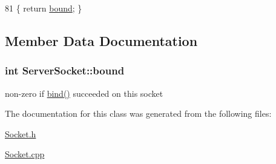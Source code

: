 \begin{DoxyCode}
81 \{ \textcolor{keywordflow}{return} \hyperlink{classServerSocket_ae7e043fe5c2a7abdcc3d83219fe5106f}{bound}; \}
\end{DoxyCode}


\subsection{Member Data Documentation}
\hypertarget{classServerSocket_ae7e043fe5c2a7abdcc3d83219fe5106f}{}
\subsubsection[{bound}]{\setlength{\rightskip}{0pt plus 5cm}int Server\+Socket\+::bound\hspace{0.3cm}{\ttfamily [protected]}}\label{classServerSocket_ae7e043fe5c2a7abdcc3d83219fe5106f}
non-\/zero if \hyperlink{classServerSocket_a6cd7ad5bd162805cb4fa9f126205e046}{bind()} succeeded on this socket 

The documentation for this class was generated from the following files\+:\begin{DoxyCompactItemize}
\item 
\hyperlink{Socket_8h}{Socket.\+h}\item 
\hyperlink{Socket_8cpp}{Socket.\+cpp}\end{DoxyCompactItemize}
